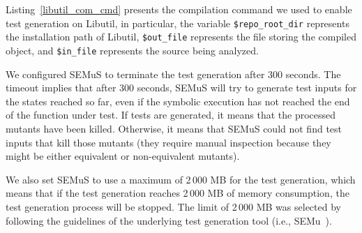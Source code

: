 Listing~\ref{libutil_com_cmd} presents the compilation command we used to enable test generation on Libutil, in particular, the variable \texttt{\$repo\_root\_dir} represents the installation path of Libutil, \texttt{\$out\_file} represents the file storing the compiled object, and \texttt{\$in\_file} represents the source being analyzed.


We configured SEMuS to terminate the test generation after 300 seconds. The timeout implies that after 300 seconds, SEMuS will try to generate test inputs for the states reached so far, even if the symbolic execution has not reached the end of the function under test. If tests are generated, it means that the processed mutants have been killed. Otherwise, it means that SEMuS could not find test inputs that kill those mutants (they require manual inspection because they might be either equivalent or non-equivalent mutants).


We also set SEMuS to use a maximum of 2\,000 MB for the test generation, which means that if the test generation reaches 2\,000 MB of memory consumption, the test generation process will be stopped. The limit of 2\,000 MB was selected by following the guidelines of the underlying test generation tool (i.e., SEMu~\cite{titcheu2021killing}).


